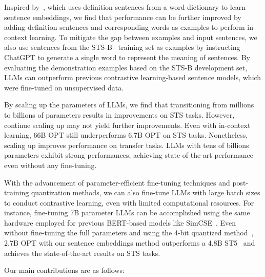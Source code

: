 \documentclass{article}
\begin{document}
Inspired by~\cite{tsukagoshi-etal-2021-defsent}, which uses definition sentences from a word dictionary to learn sentence embeddings, we find that performance can be further improved by adding definition sentences and corresponding words as examples to perform in-context learning.
To mitigate the gap between examples and input sentences, we also use sentences from the STS-B~\cite{cer2017semeval} training set as examples by instructing ChatGPT to generate a single word to represent the meaning of sentences. By evaluating the demonstration examples based on the STS-B development set, LLMs can outperform previous contrastive learning-based sentence models, which were fine-tuned on unsupervised data.

By scaling up the parameters of LLMs, we find that transitioning from millions to billions of parameters results in improvements on STS tasks.
However, continue scaling up may not yield further improvements. Even with in-context learning, 66B OPT still underperforms 6.7B OPT on STS tasks.
Nonetheless, scaling up improves performance on transfer tasks.
LLMs with tens of billions parameters exhibit strong performances, achieving state-of-the-art performance even without any fine-tuning.

With the advancement of parameter-efficient fine-tuning techniques\cite{hu2021lora, dettmers2023qlora} and post-training quantization methods\cite{frantar2022gptq}, we can also fine-tune LLMs with large batch sizes to conduct contrastive learning, even with limited computational resources.
For instance, fine-tuning 7B parameter LLMs can be accomplished using the same hardware employed for previous BERT-based models like SimCSE~\cite{gao2021simcse}. Even without fine-tuning the full parameters and using the 4-bit quantized method~\cite{dettmers2023qlora}, 2.7B OPT with our sentence embeddings method outperforms a 4.8B ST5~\cite{sentencet5} and achieves the state-of-the-art results on STS tasks. %


Our main contributions are as follows:
\end{document}
